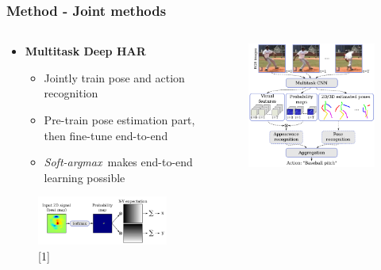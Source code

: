 \documentclass[9pt]{beamer}
\providecommand{\sourcefix}[1]{\\ \footnotesize \tugreen{Source:} [#1]}
\newenvironment{myframe}[1][]{%
\begin{frame}%
\frametitle{#1}
\setcounter{footnote}{0}


}{%
\end{frame}%
}
\begin{document}
\begin{myframe}[Method - Joint methods]
	\begin{columns}[T]
	\begin{column}{.45\textwidth}
		\begin{itemize}
			\item \textbf{Multitask Deep HAR}\footnotemark
			\begin{itemize}
                \item Jointly train pose and action recognition
                \item Pre-train pose estimation part, then fine-tune end-to-end
				\item \textit{Soft-argmax}\footnotemark~makes end-to-end learning possible
			\end{itemize}
		\end{itemize}
        \begin{figure}
            \includegraphics[width=0.99\textwidth]{softargmax.png}
            \sourcefix{1}
        \end{figure}
	\end{column}
	\begin{column}{.45\textwidth}
		\begin{figure}
			\includegraphics[width=.99\textwidth]{endtoend-concept.png}

\end{figure}
\end{column}
\end{columns}
\end{myframe}
\end{document}
